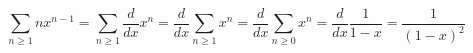 \[
\sum_{n \geq 1} nx^{n - 1}
= \sum_{n \geq 1} \frac{d}{dx} x^{n}
= \frac{d}{dx} \sum_{n \geq 1} x^{n}
= \frac{d}{dx} \sum_{n \geq 0} x^{n}
= \frac{d}{dx} \frac{1}{1 - x}
= \frac{1}{(1 - x)^2}
\]
